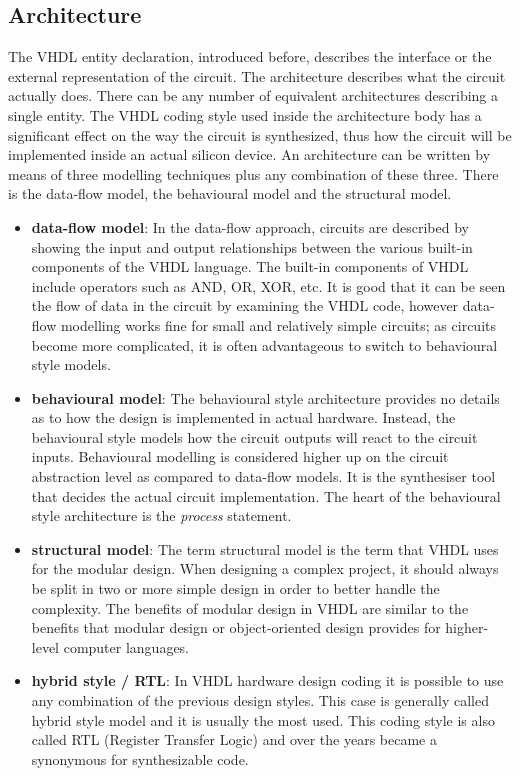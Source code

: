 \subsection{Architecture}
\noindent The VHDL entity declaration, introduced before, describes the interface or the external representation of the circuit. The architecture describes what the circuit actually does.
There can be any number of equivalent architectures describing a single entity. The VHDL coding style used inside
the architecture body has a significant effect on the way the circuit is
synthesized, thus how the circuit will be implemented inside an actual silicon device.
An architecture can be written by means of three modelling techniques
plus any combination of these three. There is the data-flow model, the behavioural model and the structural model.
\begin{itemize}
	\item \textbf{data-flow model}:
	In the data-flow approach, circuits are described by showing the input and output relationships between the various built-in components of the VHDL language. The built-in components of VHDL include operators such as AND, OR, XOR, etc.
	It is good that it can be seen the flow of data in the circuit by examining the VHDL code, however data-flow modelling works fine for small and relatively simple circuits; as circuits become more complicated, it is often advantageous to switch to behavioural style models.
	\item \textbf{behavioural model}:
	The behavioural style architecture provides no details as to how the design is implemented in actual hardware.
	Instead, the behavioural style models how the circuit outputs will react to the circuit inputs.
	Behavioural modelling is considered higher up on the circuit abstraction level as compared to data-flow models.
	It is the synthesiser tool that decides the actual circuit implementation.
	The heart of the behavioural style architecture is the \textit{process} statement.	
	\item \textbf{structural model}:
	The term structural model is the term that VHDL uses for the modular design.
	When designing a complex project, it should always be split in two or more simple design in order to better handle the complexity.
	The benefits of modular design in VHDL are similar to the benefits that modular design or object-oriented design provides for higher-level computer languages.
	\item \textbf{hybrid style / RTL}:
	In VHDL hardware design coding it is possible to use any combination of the previous design styles.
	This case is generally called hybrid style model and it is usually the most used.
	This coding style is also called RTL (Register Transfer Logic) and over the years became a synonymous for synthesizable code.    
\end{itemize}

